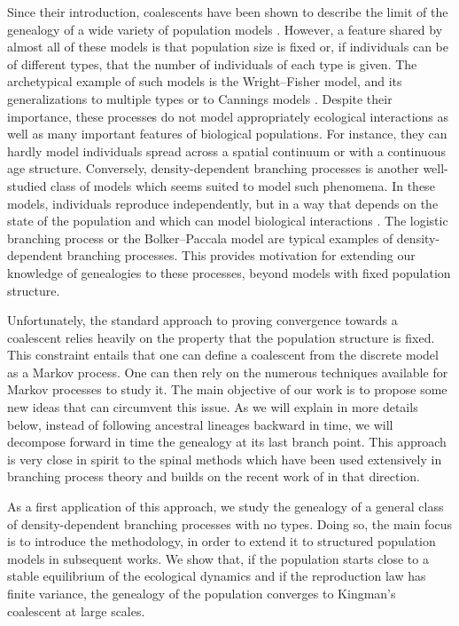 \begin{refsegment}
Since their introduction, coalescents have been shown to describe the
limit of the genealogy of a wide variety of population models 
\citep{mohle_1998, mohle1999, Mohle_Sagitov, kaj_coalescent_2003,
schweinsberg2003coalescent}. However, a feature shared by almost all of
these models is that population size is fixed or, if individuals can be
of different types, that the number of individuals of each type is given. The
archetypical example of such models is the Wright--Fisher model, and its
generalizations to multiple types or to Cannings models
\citep{cannings1974latent, etheridge_mathematical_2011}. Despite their importance,
these processes do not model appropriately ecological interactions as
well as many important features of biological populations. For instance,
they can hardly model individuals spread across a spatial continuum or
with a continuous age structure. Conversely, density-dependent branching processes
is another well-studied class of models which seems suited to model such
phenomena. In these models, individuals reproduce independently, but in a
way that depends on the state of the population and which can model biological
interactions \citep{Kurtz:1978aa, Fournier2004,
champagnat2006microscopic, meleard-tran, etheridge2023looking}. The
logistic branching process \citep{Lambert2005} or the Bolker--Paccala
model \citep{bolker1997using} are typical examples of density-dependent
branching processes. This provides motivation for extending our knowledge
of genealogies to these processes, beyond models with fixed population
structure.

Unfortunately, the standard approach to proving convergence towards a
coalescent relies heavily on the property that the population structure
is fixed. This constraint entails that one can define a coalescent from
the discrete model as a Markov process. One can then rely on the numerous
techniques available for Markov processes to study it. The main objective of
our work is to propose some new ideas that can circumvent this issue. As
we will explain in more details below, instead of following ancestral
lineages backward in time, we will decompose forward in time the
genealogy at its last branch point. This approach is very close in spirit
to the spinal methods which have been used extensively in branching
process theory \citep{lyons_pemantle_peres_1995, Bansaye2011, Harris_Roberts}
and builds on the recent work of \citet{Bansaye} in that direction.

As a first application of this approach, we study the genealogy of a
general class of density-dependent branching processes with no types. 
Doing so, the main focus is to introduce the
methodology, in order to extend it to
structured population models in subsequent works. 
We show that, if the population starts close to a stable equilibrium of the
ecological dynamics and if the reproduction law has finite variance, the
genealogy of the population converges to Kingman's coalescent at large
scales. 



\end{refsegment}
